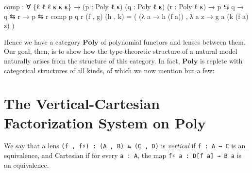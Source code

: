 \documentclass[
  11pt,
  oneside,
  article]{memoir}
\newenvironment{Shaded}{}{}
\newcommand{\NormalTok}[1]{#1}
\newcommand{\OtherTok}[1]{\textcolor[rgb]{0.00,0.44,0.13}{#1}}
\theoremstyle{definition}
\theoremstyle{plain}
\newcommand{\0}{\textsf{0}}
\newcommand{\1}{\tn{\textsf{1}}}
\begin{document}
\begin{Shaded}
\begin{Highlighting}[]
\NormalTok{comp }\OtherTok{:} \OtherTok{∀} \OtherTok{\{}\NormalTok{ℓ ℓ\textquotesingle{} ℓ\textquotesingle{}\textquotesingle{} κ κ\textquotesingle{} κ\textquotesingle{}\textquotesingle{}}\OtherTok{\}} 
       \OtherTok{→} \OtherTok{(}\NormalTok{p }\OtherTok{:}\NormalTok{ Poly ℓ κ}\OtherTok{)} \OtherTok{(}\NormalTok{q }\OtherTok{:}\NormalTok{ Poly ℓ\textquotesingle{} κ\textquotesingle{}}\OtherTok{)} \OtherTok{(}\NormalTok{r }\OtherTok{:}\NormalTok{ Poly ℓ\textquotesingle{}\textquotesingle{} κ\textquotesingle{}\textquotesingle{}}\OtherTok{)}
       \OtherTok{→}\NormalTok{ p ⇆ q }\OtherTok{→}\NormalTok{ q ⇆ r }\OtherTok{→}\NormalTok{ p ⇆ r }
\NormalTok{comp p q r }\OtherTok{(}\NormalTok{f , g}\OtherTok{)} \OtherTok{(}\NormalTok{h , k}\OtherTok{)} \OtherTok{=} 
    \OtherTok{(} \OtherTok{(λ}\NormalTok{ a }\OtherTok{→}\NormalTok{ h }\OtherTok{(}\NormalTok{f a}\OtherTok{))}\NormalTok{ , }\OtherTok{λ}\NormalTok{ a z }\OtherTok{→}\NormalTok{ g a }\OtherTok{(}\NormalTok{k }\OtherTok{(}\NormalTok{f a}\OtherTok{)}\NormalTok{ z}\OtherTok{)} \OtherTok{)}
\end{Highlighting}
\end{Shaded}

Hence we have a category \(\mathbf{Poly}\) of polynomial functors and
lenses between them. Our goal, then, is to show how the type-theoretic
structure of a natural model naturally arises from the structure of this
category. In fact, \(\mathbf{Poly}\) is replete with categorical
structures of all kinds, of which we now mention but a few:

\section{\texorpdfstring{The Vertical-Cartesian Factorization System on
\(\mathbf{Poly}\)}{The Vertical-Cartesian Factorization System on \textbackslash mathbf\{Poly\}}}\label{the-vertical-cartesian-factorization-system-on-mathbfpoly}

We say that a lens \texttt{(f\ ,\ f♯)\ :\ (A\ ,\ B)\ ⇆\ (C\ ,\ D)} is
\emph{vertical} if \texttt{f\ :\ A\ →\ C} is an equivalence, and
Cartesian if for every \texttt{a\ :\ A}, the map
\texttt{f♯\ a\ :\ D{[}f\ a{]}\ →\ B\ a} is an equivalence.
\end{document}

